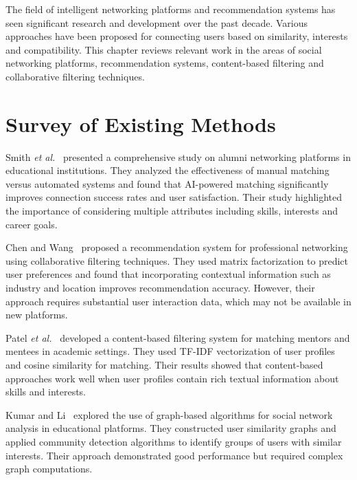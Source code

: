 \documentclass[12pt,a4paper]{report}
\let\origsection\section
\renewcommand{\section}{\needspace{4\baselineskip}\origsection}
\begin{document}
The field of intelligent networking platforms and recommendation systems has seen significant research and development over the past decade. Various approaches have been proposed for connecting users based on similarity, interests and compatibility. This chapter reviews relevant work in the areas of social networking platforms, recommendation systems, content-based filtering and collaborative filtering techniques.

\section{Survey of Existing Methods}

Smith \textit{et al.}~\cite{Smith2022} presented a comprehensive study on alumni networking platforms in educational institutions. They analyzed the effectiveness of manual matching versus automated systems and found that AI-powered matching significantly improves connection success rates and user satisfaction. Their study highlighted the importance of considering multiple attributes including skills, interests and career goals.

\medskip

\noindent
Chen and Wang~\cite{Chen2022} proposed a recommendation system for professional networking using collaborative filtering techniques. They used matrix factorization to predict user preferences and found that incorporating contextual information such as industry and location improves recommendation accuracy. However, their approach requires substantial user interaction data, which may not be available in new platforms.

\medskip

\noindent
Patel \textit{et al.}~\cite{Patel2023} developed a content-based filtering system for matching mentors and mentees in academic settings. They used TF-IDF vectorization of user profiles and cosine similarity for matching. Their results showed that content-based approaches work well when user profiles contain rich textual information about skills and interests.

\medskip

\noindent
Kumar and Li~\cite{Kumar2023} explored the use of graph-based algorithms for social network analysis in educational platforms. They constructed user similarity graphs and applied community detection algorithms to identify groups of users with similar interests. Their approach demonstrated good performance but required complex graph computations.
\end{document}
